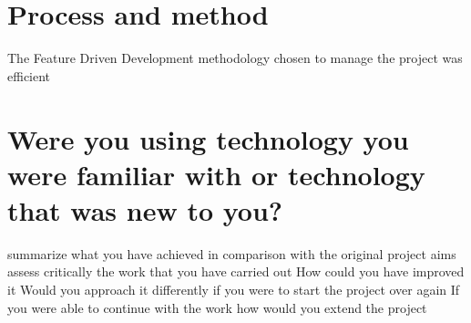 \section*{Process and method}   
The Feature Driven Development methodology chosen to manage the project was efficient    




\section{Were you using technology you were familiar with or technology that was new to you?}

summarize what you have achieved in comparison with the original project aims 
assess critically the work that you have carried out
How could you have improved it
Would you approach it differently if you were to start the project over again
If you were able to continue with the work how would you extend the project
